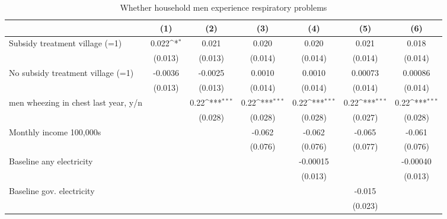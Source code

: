 \begin{table}[htbp]\centering
\def\sym#1{\ifmmode^{#1}\else\(^{#1}\)\fi}
\caption{Whether household men experience respiratory problems}
\begin{tabular*}{1\hsize}{@{\hskip\tabcolsep\extracolsep\fill}l*{6}{c}}
\toprule
                &\multicolumn{1}{c}{(1)}         &\multicolumn{1}{c}{(2)}         &\multicolumn{1}{c}{(3)}         &\multicolumn{1}{c}{(4)}         &\multicolumn{1}{c}{(5)}         &\multicolumn{1}{c}{(6)}         \\
\midrule
Subsidy treatment village (=1)&    0.022\sym{*}  &    0.021         &    0.020         &    0.020         &    0.021         &    0.018         \\
                &  (0.013)         &  (0.013)         &  (0.014)         &  (0.014)         &  (0.014)         &  (0.014)         \\
No subsidy treatment village (=1)&  -0.0036         &  -0.0025         &   0.0010         &   0.0010         &  0.00073         &  0.00086         \\
                &  (0.013)         &  (0.013)         &  (0.014)         &  (0.014)         &  (0.014)         &  (0.014)         \\
men wheezing in chest last year, y/n&                  &     0.22\sym{***}&     0.22\sym{***}&     0.22\sym{***}&     0.22\sym{***}&     0.22\sym{***}\\
                &                  &  (0.028)         &  (0.028)         &  (0.028)         &  (0.027)         &  (0.028)         \\
Monthly income 100,000s&                  &                  &   -0.062         &   -0.062         &   -0.065         &   -0.061         \\
                &                  &                  &  (0.076)         &  (0.076)         &  (0.077)         &  (0.076)         \\
Baseline any electricity&                  &                  &                  & -0.00015         &                  & -0.00040         \\
                &                  &                  &                  &  (0.013)         &                  &  (0.013)         \\
Baseline gov. electricity&                  &                  &                  &                  &   -0.015         &                  \\
                &                  &                  &                  &                  &  (0.023)         &                  \\

\end{tabular*}
\end{table}
